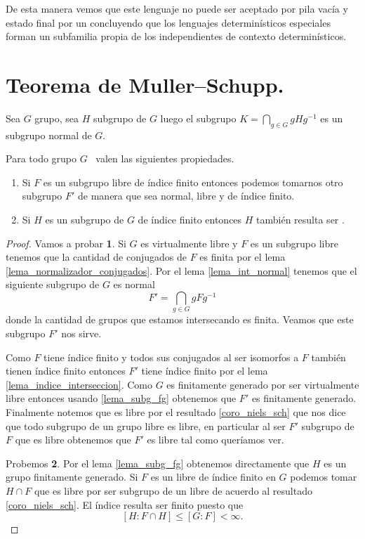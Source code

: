 \documentclass[tesis.tex]{subfiles}
\begin{document}
\begin{ej}
	De esta manera vemos que este lenguaje no puede ser aceptado por pila vacía y estado final por un \APD concluyendo que los lenguajes determinísticos especiales forman un subfamilia propia de los independientes de contexto determinísticos.
\end{ej}


\section{Teorema de Muller--Schupp.}


\begin{lema}\label{lema_int_normal}
	Sea $G$ grupo, sea $H$ subgrupo de $G$ luego el subgrupo $K = \bigcap_{g \in G} gHg^{-1}$ es un subgrupo normal de $G$.
\end{lema}


\begin{prop}\label{prop_vls}
	Para todo grupo $G$ \vl \ valen las siguientes propiedades.
	\begin{enumerate}
		\item Si $F$ es un subgrupo libre de índice finito entonces podemos tomarnos otro subgrupo $F'$ de manera que sea normal, libre y de índice finito.
		\item Si $H$ es un subgrupo de $G$ de índice finito entonces $H$ también resulta ser \vl.
	\end{enumerate}
\end{prop}

\begin{proof}
	Vamos a probar \textbf{1}.
	Si $G$ es virtualmente libre y $F$ es un subgrupo libre tenemos que la cantidad de conjugados de $F$ es finita por el lema \ref{lema_normalizador_conjugados}.
	Por el lema \ref{lema_int_normal} tenemos que el siguiente subgrupo de $G$ es normal
	\[
	F' = \bigcap_{g \in G} gFg^{-1}
	\]
	donde la cantidad de grupos que estamos intersecando es finita.
	Veamos que este subgrupo $F'$ nos sirve. 
	
	
	Como $F$ tiene índice finito y todos sus conjugados al ser isomorfos a $F$ también tienen índice finito entonces $F'$ tiene índice finito por el lema \ref{lema_indice_interseccion}.
	Como $G$ es finitamente generado por ser virtualmente libre entonces usando \ref{lema_subg_fg} obtenemos que $F'$ es finitamente generado.
	Finalmente notemos que es libre por el resultado \ref{coro_niels_sch} que nos dice que todo subgrupo de un grupo libre es libre, en particular al ser $F'$ subgrupo de $F$ que es libre obtenemos que $F'$ es libre tal como queríamos ver.
	
	Probemos \textbf{2}. 
	Por el lema \ref{lema_subg_fg} obtenemos directamente que $H$ es un grupo finitamente generado.
	Si $F$ es un libre de índice finito en $G$ podemos tomar $H \cap F$ que es libre por ser subgrupo de un libre de acuerdo al resultado \ref{coro_niels_sch}.
	El índice resulta ser finito puesto que 
	\[
	[H:F\cap H] \le [G:F] < \infty.
	\]
\end{proof}
\end{document}
